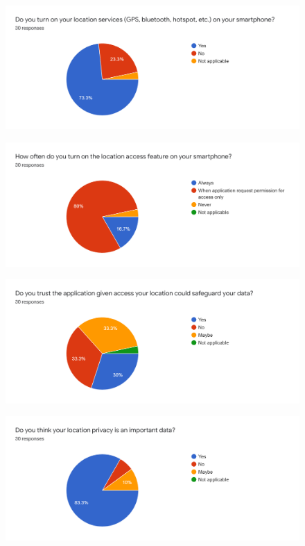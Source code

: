   \begin{figure}[H]
    \centering
    \includegraphics[width=\linewidth]{img/Survey/Q5.png}
  \end{figure}
  \begin{figure}[H]
    \centering
    \includegraphics[width=\linewidth]{img/Survey/Q6.png}
  \end{figure}
  \begin{figure}[H]
    \centering
    \includegraphics[width=\linewidth]{img/Survey/Q7.png}
  \end{figure}
  \begin{figure}[H]
    \centering
    \includegraphics[width=\linewidth]{img/Survey/Q8.png}
  \end{figure}
